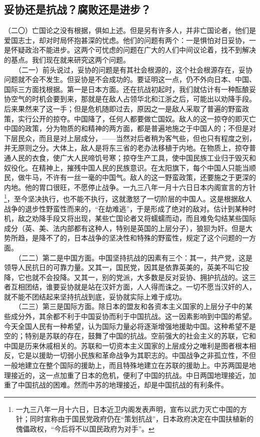 \documentclass[cn,11pt,chinese]{elegantbook}
\def\myformat#1{\hfil\hfil #1}
\begin{document}
\subsection*{\myformat{妥协还是抗战？腐败还是进步？}}
（二〇）亡国论之没有根据，俱如上述。但是另有许多人，并非亡国论者，他们是爱国志士，却对时局怀抱甚深的忧虑。他们的问题有两个：一是惧怕对日妥协，一是怀疑政治不能进步。这两个可忧虑的问题在广大的人们中间议论着，找不到解决的基点。我们现在就来研究这两个问题。\\
　　（二一）前头说过，妥协的问题是有其社会根源的，这个社会根源存在，妥协问题就不会不发生。但妥协是不会成功的。要证明这一点，仍不外向日本、中国、国际三方面找根据。第一是日本方面。还在抗战初起时，我们就估计有一种酝酿妥协空气的时机会要到来，那就是在敌人占领华北和江浙之后，可能出以劝降手段。后来果然来了这一手；但是危机随即过去，原因之一是敌人采取了普遍的野蛮政策，实行公开的掠夺。中国降了，任何人都要做亡国奴。敌人的这一掠夺的即灭亡中国的政策，分为物质的和精神的两方面，都是普遍地施之于中国人的；不但是对下层民众，而且是对上层成分，——当然对后者稍为客气些，但也只有程度之别，并无原则之分。大体上，敌人是将东三省的老办法移植于内地。在物质上，掠夺普通人民的衣食，使广大人民啼饥号寒；掠夺生产工具，使中国民族工业归于毁灭和奴役化。在精神上，摧残中国人民的民族意识。在太阳旗下，每个中国人只能当顺民，做牛马，不许有一丝一毫的中国气。敌人的这一野蛮政策，还要施之于更深的内地。他的胃口很旺，不愿停止战争。一九三八年一月十六日日本内阁宣言的方针\footnote[14]{ 一九三八年一月十六日，日本近卫内阁发表声明，宣布以武力灭亡中国的方针；同时宣称由于国民党政府仍在“策划抗战”，日本政府决定在中国扶植新的傀儡政权，“今后将不以国民政府为对手”。}，至今坚决执行，也不能不执行，这就激怒了一切阶层的中国人。这是根据敌人战争的退步性野蛮性而来的，“在劫难逃”，于是形成了绝对的敌对。估计到某种时机，敌之劝降手段又将出现，某些亡国论者又将蠕蠕而动，而且难免勾结某些国际成分（英、美、法内部都有这种人，特别是英国的上层分子），狼狈为奸。但是大势所趋，是降不了的，日本战争的坚决性和特殊的野蛮性，规定了这个问题的一方面。\\
　　（二二）第二是中国方面。中国坚持抗战的因素有三个：其一，共产党，这是领导人民抗日的可靠力量。又其一，国民党，因其是依靠英美的，英美不叫它投降，它也就不会投降。又其一，别的党派，大多数是反对妥协、拥护抗战的。这三者互相团结，谁要妥协就是站在汉奸方面，人人得而诛之。一切不愿当汉奸的人，就不能不团结起来坚持抗战到底，妥协就实际上难于成功。\\
　　（二三）第三是国际方面。除日本的盟友和各资本主义国家的上层分子中的某些成分外，其余都不利于中国妥协而利于中国抗战。这一因素影响到中国的希望。今天全国人民有一种希望，认为国际力量必将逐渐增强地援助中国。这种希望不是空的；特别是苏联的存在，鼓舞了中国的抗战。空前强大的社会主义的苏联，它和中国是历来休戚相关的。苏联和一切资本主义国家的上层成分之唯利是图者根本相反，它是以援助一切弱小民族和革命战争为其职志的。中国战争之非孤立性，不但一般地建立在整个国际的援助上，而且特殊地建立在苏联的援助上。中苏两国是地理接近的，这一点加重了日本的危机，便利了中国的抗战。中日两国地理接近，加重了中国抗战的困难。然而中苏的地理接近，却是中国抗战的有利条件。\\
\end{document}
